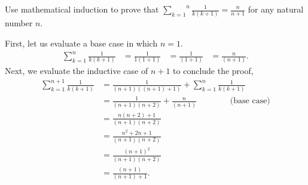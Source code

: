 \documentclass[12pt,letterpaper]{exam}
\begin{document}
\begin{questions}
\question
Use mathematical induction to prove that
\(\overset{n}{\underset{k=1}{\sum}}\frac{1}{k(k+1)} = \frac{n}{n+1}\)
for any natural number \(n\).

\begin{solution}
    First, let us evaluate a base case in which \(n=1\).
    \begin{align*}
        \sum_{k=1}^{n} \frac{1}{k(k+1)}
        &= \frac{1}{1(1+1)}
        &= \frac{1}{(1+1)}
        &= \frac{n}{(n+1)}.
    \end{align*}
    Next, we evaluate the inductive case of \(n+1\) to conclude the proof,
    \begin{align*}
        \sum_{k=1}^{n+1} \frac{1}{k(k+1)}
        &= \frac{1}{(n+1)((n+1)+1)} + \sum_{k=1}^{n} \frac{1}{k(k+1)} \\
        &= \frac{1}{(n+1)(n+2)} + \frac{n}{(n+1)} \hspace{4em}\text{(base case)}\\
        &= \frac{n(n+2) + 1}{(n+1)(n+2)} \\
        &= \frac{n^2 + 2n + 1}{(n+1)(n+2)} \\
        &= \frac{(n+1)^2}{(n+1)(n+2)} \\
        &= \frac{(n+1)}{(n+1)+1}.
    \end{align*}
\end{solution}
\clearpage


\end{questions}
\end{document}
